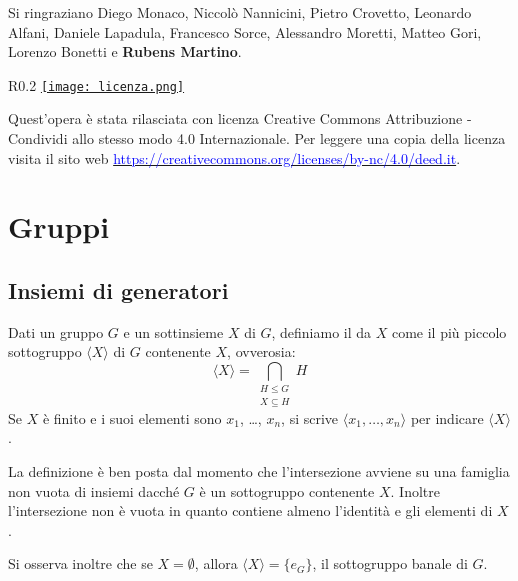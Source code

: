 \documentclass[11pt]{scrartcl}
\begin{document}
	Si ringraziano Diego Monaco, Niccolò Nannicini, Pietro Crovetto, Leonardo Alfani,
	Daniele Lapadula, Francesco Sorce, Alessandro Moretti, Matteo Gori, Lorenzo Bonetti e \textbf{Rubens Martino}.
	
	\mbox{}
	\vfill
	\begin{wrapfigure}{R}{0.2\textwidth}
		\centering
		\href{https://creativecommons.org/licenses/by-nc/4.0/deed.it}{\texttt{[image: licenza.png]}}
	\end{wrapfigure}
	
	Quest'opera è stata rilasciata con licenza Creative Commons Attribuzione - Condividi allo stesso modo 4.0 Internazionale. Per leggere
	una copia della licenza visita il sito web \href{http://creativecommons.org/licenses/by-sa/4.0/deed.it}{\textcolor{blue}{https://creativecommons.org/licenses/by-nc/4.0/deed.it}}.\\
	
	\newpage
	
	\section{Gruppi}
	
	\subsection{Insiemi di generatori}
	
	\begin{definition}
		Dati un gruppo $G$ e un sottinsieme $X$ di $G$, definiamo il  da $X$ come il più piccolo sottogruppo $\langle X
		\rangle$ di $G$ contenente $X$, ovverosia: \[\langle X \rangle =
		\bigcap_{\substack{H\leqslant G\\ X \subseteq H}} H\]
		Se $X$ è finito e i suoi elementi sono $x_1$, \ldots, $x_n$, si
		scrive $\langle x_1, \ldots, x_n \rangle$ per indicare
		$\langle X \rangle$.
	\end{definition}
	
	\begin{remark}
		La definizione è ben posta dal momento che l'intersezione avviene su una 
		famiglia non vuota di insiemi dacché $G$ è un sottogruppo
		contenente $X$. Inoltre l'intersezione non è vuota in 
		quanto contiene almeno l'identità e gli elementi di $X$. \medskip
		
		
		Si osserva inoltre che se $X = \emptyset$, allora $\langle X \rangle = \{e_G\}$, il sottogruppo banale di $G$.
	\end{remark}
	
\end{document}
